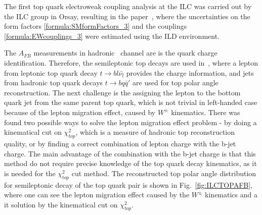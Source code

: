 The first top quark electroweak coupling analysis at the ILC was carried out by the ILC group in Orsay, resulting in the paper~\cite{bib:ILCTOP}, where the uncertainties on the form factors \ref{formula:SMformFactors_3} and the couplings \ref{formula:EWcouplings_3} were estimated using the ILD environment.


The $A_{FB}$ measurements in hadronic \ttbar\ channel are  is the quark charge identification. Therefore, the semileptonic top decays are used in~\cite{bib:ILCTOP}, where  a lepton from leptonic top quark decay $t\to b l \bar{\nu_l}$ provides the charge information, and jets from hadronic top quark decays $t \to b q \bar{q}'$ are used for top polar angle reconstruction. 
The next challenge is the assigning the lepton to the bottom quark jet from the same parent top quark, which is not trivial in left-handed case because of the lepton migration effect, caused by $W^\pm$ kinematics. 
There was found two possible ways to solve the lepton migration effect problem - by doing a kinematical cut on $\chi^2_{top}$, which is a measure of hadronic top reconstruction quality, or by finding a correct combination of lepton charge with the b-jet charge. 
The main advantage of the combination with the b-jet charge is that this method do not require precise knowledge of the top quark decay kinematics, as it is needed for the $\chi^2_{top}$ cut method. The reconstructed top polar angle distribution for semileptonic decay of the top quark pair is shown in Fig.~\ref{fig:ILCTOPAFB}, where one can see the lepton migration effect caused by the $W^\pm$ kinematics and a it solution by the kinematical cut on $\chi^2_{top}$.


